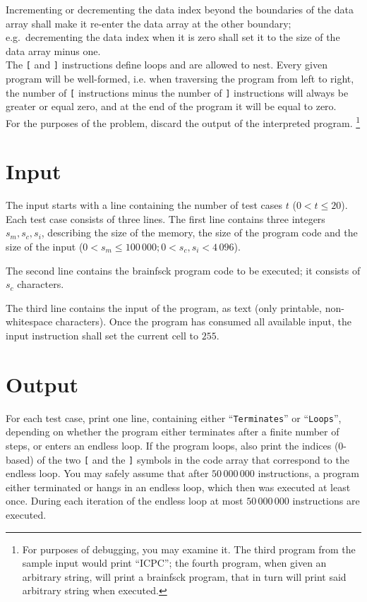 Incrementing or decrementing the data index beyond the
boundaries of the data array shall make it re-enter the data array at
the other boundary; e.g.\ decrementing the data index when it is
zero shall set it to the size of the data array minus one.\\

The \verb+[+ and \verb+]+ instructions define loops and are allowed to
nest. Every given program will be well-formed, i.e. when traversing
the program from left to right, the number of \verb+[+ instructions
minus the number of \verb+]+ instructions will always be greater or
equal zero, and at the end of the program it will be equal to zero.\\

For the purposes of the problem, discard the output of the interpreted program.
\footnote{For purposes of debugging, you may examine it. The third program
	from the sample input would print ``ICPC''; the fourth program,
	when given an arbitrary string, will print a brainfsck program, that in
	turn will print said arbitrary string when executed.}



\section*{Input}
The input starts with a line containing the number of test cases $t$ ($0 < t \le 20$). Each
test case consists of three lines. The first line contains three integers $s_m,
s_c, s_i$, describing the size of the memory, the size of the program code and
the size of the input ($0 < s_m \le 100\,000; 0 < s_c, s_i < 4\,096$).

The second line contains the brainfsck program code to be executed; it
consists of $s_c$ characters.

The third line contains the input of the program, as text (only printable,
non-whitespace characters). Once the program has consumed all available input,
the input instruction shall set the current cell to $255$.

\section*{Output}
For each test case, print one line, containing either ``{\tt Terminates}'' or
``{\tt Loops}'', depending on whether the program either terminates after a
finite number of steps, or enters an endless loop. If the program loops, also
print the indices ($0$-based) of the two \verb+[+ and the \verb+]+ symbols in
the code array that correspond to the endless loop. You may safely assume that
after $50\,000\,000$ instructions, a program either terminated or hangs in an
endless loop, which then was executed at least once. During each iteration of the endless loop
 at most $50\,000\,000$ instructions are executed.
